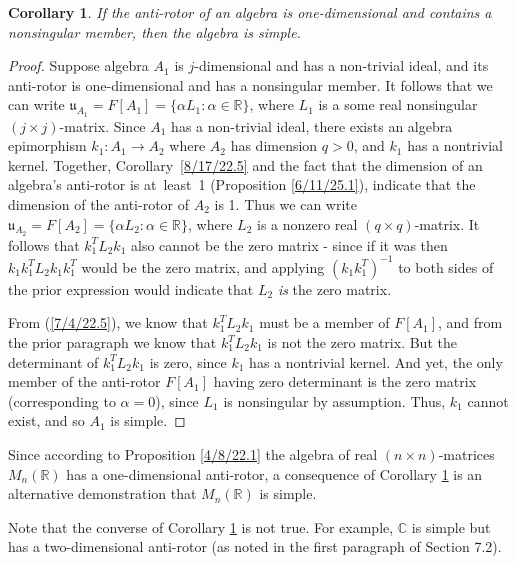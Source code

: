 \documentclass{amsart}
\newtheorem{corollary}[theorem]{Corollary}
\theoremstyle{definition}
\numberwithin{theorem}{section}
\numberwithin{equation}{section}
\begin{document}
\begin{corollary}\label{8/17/22.1} If the anti-rotor of an algebra is one-dimensional and contains a nonsingular member, then the algebra is simple. \end{corollary}

\begin{proof} Suppose algebra $A_1$ is $j$-dimensional and has a non-trivial ideal, and its anti-rotor is one-dimensional and has a nonsingular member.  It follows that we can write $\mathfrak{u}_{A_1} = F[A_1] = \{\alpha L_1:\alpha\in \mathbb{R}\}$, where $L_1$ is a some real nonsingular $(j\times j)$-matrix.  Since $A_1$ has a non-trivial ideal, there exists an algebra epimorphism $k_1:A_1\rightarrow A_2$ where $A_2$ has dimension $q>0$, and $k_1$ has a nontrivial kernel.  Together, \mbox{Corollary \ref{8/17/22.5}} and the fact that the dimension of an algebra's anti-rotor is \mbox{at least 1} (Proposition \ref{6/11/25.1}), indicate that the dimension of the anti-rotor of $A_2$ is 1.   Thus we can write $\mathfrak{u}_{A_2} = F[A_2] = \{\alpha L_2:\alpha\in \mathbb{R}\}$, where $L_2$ is a nonzero real $(q\times q)$-matrix.  It follows that $k_1^T L_2 k_1$ also cannot be the zero matrix - since if it was then $k_1k_1^T L_2 k_1k_1^T$ would be the zero matrix, and applying $(k_1k_1^T)^{-1}$ to both sides of the prior expression would indicate that $L_2$ {\it is} the zero matrix.  

From (\ref{7/4/22.5}), we know that $ k_1^T L_2 k_1$ must be a member of $F[A_1]$, and from the prior paragraph we know that $ k_1^T L_2 k_1$ is not the zero matrix.  But the determinant of $k_1^T L_2 k_1$ is zero, since $k_1$ has a  nontrivial kernel.  And yet, the only member of the anti-rotor $F[A_1]$ having zero determinant is the zero matrix (corresponding to $\alpha=0$), since $L_1$ is nonsingular by assumption.   Thus, $k_1$ cannot exist, and so $A_1$ is simple. \end{proof}

Since according to Proposition \ref{4/8/22.1} the algebra of real $(n\times n)$-matrices $M_n(\mathbb{R})$ has a one-dimensional anti-rotor, a consequence of Corollary \ref{8/17/22.1} is an alternative demonstration that $M_n(\mathbb{R})$ is simple.  

Note that the converse of Corollary \ref{8/17/22.1} is not true.  For example, $\mathbb{C}$ is simple but has a two-dimensional anti-rotor (as noted in the first paragraph of Section 7.2). 
  
 
     
\end{document}
